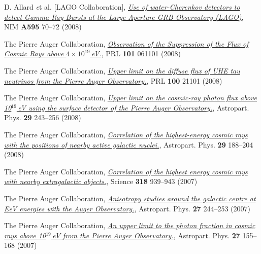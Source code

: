 \begin{etaremune}
\item {}D. Allard {\emph et al.} [LAGO Collaboration],
\href{http://dx.doi.org/10.1016/j.nima.2008.07.041}{\emph{Use of
water-Cherenkov detectors to detect Gamma Ray Bursts at the Large Aperture GRB
Observatory (LAGO)}}, NIM {\bf A595} 70--72 (2008)

\item {}The Pierre Auger Collaboration,
\href{http://dx.doi.org/10.1103/PhysRevLett.101.061101}{\emph{Observation of
the Suppression of the Flux of Cosmic Rays above $4\times10^{19}$\,eV.}}, PRL
{\bf 101} 061101 (2008)

\item {}The Pierre Auger Collaboration,
\href{http://dx.doi.org/10.1103/PhysRevLett.100.211101}{\emph{Upper limit on
the diffuse flux of UHE tau neutrinos from the Pierre Auger Observatory.}}, PRL
{\bf 100} 21101 (2008)

\item {}The Pierre Auger Collaboration,
\href{http://dx.doi.org/10.1016/j.astropartphys.2008.01.003}{\emph{Upper limit
on the cosmic-ray photon flux above 10$^{19}$\,eV using the surface detector of
the Pierre Auger Observatory.}}, Astropart. Phys. {\bf 29} 243--256 (2008)

\item {}The Pierre Auger Collaboration,
\href{http://dx.doi.org/10.1016/j.astropartphys.2008.01.002}{\emph{Correlation
of the highest-energy cosmic rays with the positions of nearby active galactic
nuclei.}}, Astropart. Phys. {\bf 29} 188--204 (2008)

\item {}The Pierre Auger Collaboration,
\href{http://dx.doi.org/10.1126/science.1151124}{\emph{Correlation of the
highest energy cosmic rays with nearby extragalactic objects.}}, Science {\bf
318} 939--943 (2007)

\item {}The Pierre Auger Collaboration,
\href{http://dx.doi.org/10.1016/j.astropartphys.2006.11.002}{\emph{Anisotropy
studies around the galactic centre at EeV energies with the Auger
Observatory.}},  Astropart. Phys. {\bf 27} 244--253 (2007)

\item {}The Pierre Auger Collaboration,
\href{http://dx.doi.org/10.1016/j.astropartphys.2006.10.004}{\emph{An upper
limit to the photon fraction in cosmic rays above 10$^{19}$\,eV from the Pierre
Auger Observatory.}}, Astropart. Phys. {\bf 27} 155--168 (2007)
\end{etaremune}

